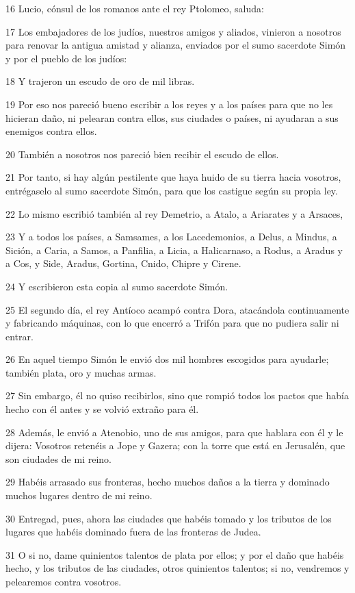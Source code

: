 \par 16 Lucio, cónsul de los romanos ante el rey Ptolomeo, saluda:
\par 17 Los embajadores de los judíos, nuestros amigos y aliados, vinieron a nosotros para renovar la antigua amistad y alianza, enviados por el sumo sacerdote Simón y por el pueblo de los judíos:
\par 18 Y trajeron un escudo de oro de mil libras.
\par 19 Por eso nos pareció bueno escribir a los reyes y a los países para que no les hicieran daño, ni pelearan contra ellos, sus ciudades o países, ni ayudaran a sus enemigos contra ellos.
\par 20 También a nosotros nos pareció bien recibir el escudo de ellos.
\par 21 Por tanto, si hay algún pestilente que haya huido de su tierra hacia vosotros, entrégaselo al sumo sacerdote Simón, para que los castigue según su propia ley.
\par 22 Lo mismo escribió también al rey Demetrio, a Atalo, a Ariarates y a Arsaces,
\par 23 Y a todos los países, a Samsames, a los Lacedemonios, a Delus, a Mindus, a Sición, a Caria, a Samos, a Panfilia, a Licia, a Halicarnaso, a Rodus, a Aradus y a Cos, y Side, Aradus, Gortina, Cnido, Chipre y Cirene.
\par 24 Y escribieron esta copia al sumo sacerdote Simón.
\par 25 El segundo día, el rey Antíoco acampó contra Dora, atacándola continuamente y fabricando máquinas, con lo que encerró a Trifón para que no pudiera salir ni entrar.
\par 26 En aquel tiempo Simón le envió dos mil hombres escogidos para ayudarle; también plata, oro y muchas armas.
\par 27 Sin embargo, él no quiso recibirlos, sino que rompió todos los pactos que había hecho con él antes y se volvió extraño para él.
\par 28 Además, le envió a Atenobio, uno de sus amigos, para que hablara con él y le dijera: Vosotros retenéis a Jope y Gazera; con la torre que está en Jerusalén, que son ciudades de mi reino.
\par 29 Habéis arrasado sus fronteras, hecho muchos daños a la tierra y dominado muchos lugares dentro de mi reino.
\par 30 Entregad, pues, ahora las ciudades que habéis tomado y los tributos de los lugares que habéis dominado fuera de las fronteras de Judea.
\par 31 O si no, dame quinientos talentos de plata por ellos; y por el daño que habéis hecho, y los tributos de las ciudades, otros quinientos talentos; si no, vendremos y pelearemos contra vosotros.
